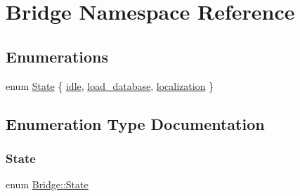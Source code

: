 \hypertarget{namespaceBridge}{}\section{Bridge Namespace Reference}
\label{namespaceBridge}
\subsection*{Enumerations}
\begin{DoxyCompactItemize}
\item 
enum \hyperlink{namespaceBridge_a58acad8bf83b6df8e000fd21a8be62a9}{State} \{ \newline
\hyperlink{namespaceBridge_a58acad8bf83b6df8e000fd21a8be62a9a663a609b9fbd926acff431382ba59034}{idle}, 
\newline
\hyperlink{namespaceBridge_a58acad8bf83b6df8e000fd21a8be62a9ae5a6c219405776236d738c8e0f3be438}{load\+\_\+database}, 
\newline
\hyperlink{namespaceBridge_a58acad8bf83b6df8e000fd21a8be62a9a72b5e0b430183aa37e9b33dea060a439}{localization}
 \}
\end{DoxyCompactItemize}


\subsection{Enumeration Type Documentation}
\mbox{\label{namespaceBridge_a58acad8bf83b6df8e000fd21a8be62a9}} 
\subsubsection{\texorpdfstring{State}{State}}
{\footnotesize\ttfamily enum \hyperlink{namespaceBridge_a58acad8bf83b6df8e000fd21a8be62a9}{Bridge\+::\+State}}

